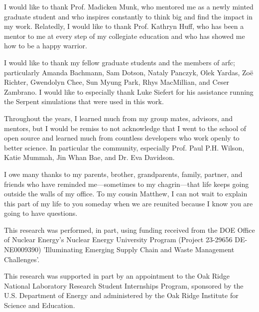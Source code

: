 I would like to thank Prof. Madicken Munk, who mentored me as a newly minted
graduate student and who inspires constantly to think big and find the impact
in my work. Relatedly, I would like to thank Prof. Kathryn Huff, who has been a
mentor to me at every step of my collegiate education and who has
showed me how to be a happy warrior.

I would like to thank my fellow graduate students and the members of
\gls{arfc}; particularly Amanda Bachmann, Sam Dotson, Nataly Panczyk, Olek
Yardas, Zo\"{e} Richter, Gwendolyn Chee, Sun Myung Park, Rhys MacMillian,
and Ceser Zambrano. I would like to especially thank Luke Siefert for his
assistance running the Serpent simulations that were used in this work.

Throughout the years, I learned much from my group mates, advisors, and
mentors, but I would be remiss to not acknowledge that I went to the school of
open source and learned much from countless developers who work openly to
better science. In particular the \cyclus community, especially Prof. Paul P.H.
Wilson, Katie Mummah, Jin Whan Bae, and Dr. Eva Davidson.

I owe many thanks to my parents, brother, grandparents, family, partner, and
friends who have reminded me---sometimes to my chagrin---that life keeps going
outside the walls of my office. To my cousin Matthew, I can not wait to explain
this part of my life to you someday when we are reunited because I know you are
going to have questions.

This research was performed, in part, using funding received from the DOE
Office of Nuclear Energy's Nuclear Energy University Program (Project 23-29656
DE-NE0009390) 'Illuminating Emerging Supply Chain and Waste Management
Challenges'.

This research was supported in part by an appointment to the Oak Ridge National
Laboratory Research Student Internships Program, sponsored by the U.S.
Department of Energy and administered by the Oak Ridge Institute for Science
and Education.